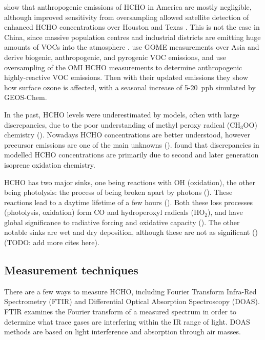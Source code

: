     \cite{Millet2008} show that anthropogenic emissions of HCHO in America are mostly negligible, although improved sensitivity from oversampling allowed satellite detection of enhanced HCHO concentrations over Houston and Texas \citep{Zhu2014}.
    This is not the case in China, since massive population centres and industrial districts are emitting huge amounts of VOCs into the atmosphere \citep{Fu2007}.
    \cite{Fu2007} use GOME measurements over Asia and derive biogenic, anthropogenic, and pyrogenic VOC emissions, and \cite{Zhu2014} use oversampling of the OMI HCHO measurements to determine anthropogenic highly-reactive VOC emissions.
    Then with their updated emissions they show how surface ozone is affected, with a seasonal increase of 5-20~ppb simulated by GEOS-Chem.
    
    In the past, HCHO levels were underestimated by models, often with large discrepancies, due to the poor understanding of methyl peroxy radical (CH$_3$OO) chemistry (\cite{Wagner2002}).
    Nowadays HCHO concentrations are better understood, however precursor emissions are one of the main unknowns (\cite[eg.]{Emmerson2016,Marvin2017}).
    \cite{Marvin2017} found that discrepancies in modelled HCHO concentrations are primarily due to second and later generation isoprene oxidation chemistry.
    
    HCHO has two major sinks, one being reactions with OH (oxidation), the other being photolysis: the process of being broken apart by photons (\cite{Crutzen1999, Wagner2002, Levy1972, Kefauver2014}).
    These reactions lead to a daytime lifetime of a few hours (\cite{Atkinson2000, Millet2006}).
    Both these loss processes (photolysis, oxidation) form CO and hydroperoxyl radicals (HO$_2$), and have global significance to radiative forcing and oxidative capacity (\cite{Franco2015}).
    The other notable sinks are wet and dry deposition, although these are not as significant (\cite{Atkinson2000}) (TODO: add more cites here).
    
  \subsection{Measurement techniques}
  \label{LR:HCHO:Measurements}
    There are a few ways to measure HCHO, including Fourier Transform Infra-Red Spectrometry (FTIR) and Differential Optical Absorption Spectroscopy (DOAS).
    FTIR examines the Fourier transform of a measured spectrum in order to determine what trace gases are interfering within the IR range of light.
    DOAS methods are based on light interference and absorption through air masses.
    
